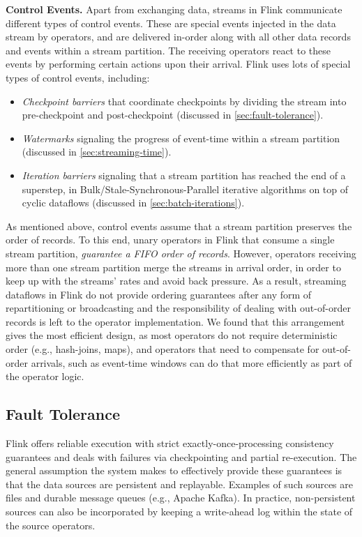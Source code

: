 \documentclass[11pt]{article}
\newcommand{\para}[1]{\vspace{2mm}\noindent\textbf{#1}}
\begin{document}
\para{Control Events.} Apart from exchanging data, streams in Flink communicate different types of control events. These are special events injected in the data stream by operators, and are delivered in-order along with all other data records and events within a stream partition. The receiving operators react to these events by performing certain actions upon their arrival. Flink uses lots of special types of control events, including: \vspace{-2mm}
\begin{itemize}
\item \textit{Checkpoint barriers} that coordinate checkpoints by dividing the stream into pre-checkpoint and post-checkpoint (discussed in \autoref{sec:fault-tolerance}). \vspace{-3mm}
\item \textit{Watermarks} signaling the progress of event-time within a stream partition (discussed in \autoref{sec:streaming-time}). \vspace{-3mm}
\item \textit{Iteration barriers} signaling that a stream partition has reached the end of a superstep, in Bulk/Stale-Synchronous-Parallel iterative algorithms on top of cyclic dataflows (discussed in \autoref{sec:batch-iterations}). \vspace{-1mm}
\end{itemize}

As mentioned above, control events assume that a stream partition preserves the order of records. To this end, unary operators in Flink that consume a single stream partition, \emph{guarantee a FIFO order of records}. However, operators receiving more than one stream partition merge the streams in arrival order, in order to keep up with the streams' rates and avoid back pressure. As a result, streaming dataflows in Flink do not provide ordering guarantees after any form of repartitioning or broadcasting and the responsibility of dealing with out-of-order records is left to the operator implementation. We found that this arrangement gives the most efficient design, as most operators do not require deterministic order (e.g., hash-joins, maps), and operators that need to compensate for out-of-order arrivals, such as event-time windows can do that more efficiently as part of the operator logic.

\vspace{-3mm}
\subsection{Fault Tolerance}
\label{sec:fault-tolerance}
\vspace{-2mm}
Flink offers reliable execution with strict exactly-once-processing consistency guarantees and deals with failures via checkpointing and partial re-execution. The general assumption the system makes to effectively provide these guarantees is that the data sources are persistent and replayable. Examples of such sources are files and durable message queues (e.g., Apache Kafka). In practice, non-persistent sources can also be incorporated by keeping a write-ahead log within the state of the source operators.
\end{document}
